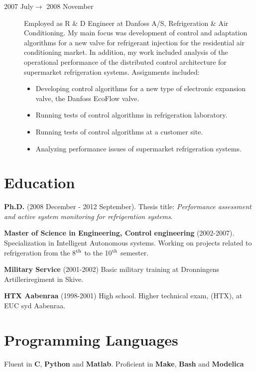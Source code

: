 \documentclass[margin,line,a4paper]{resume}
\begin{document}
\begin{resume}
\begin{description}
    \item[2007 July$\rightarrow$ 2008 November] Employed as R \& D Engineer at Danfoss A/S, Refrigeration \& Air Conditioning. My main focus was development of control and adaptation algorithms for a new valve for refrigerant injection for the residential air conditioning market. In addition, my work included analysis of the operational performance of the distributed control architecture for supermarket refrigeration systems.
      Assignments included:
      \begin{itemize}
      \item Developing control algorithms for a new type of electronic expansion valve, the Danfoss EcoFlow valve.
      \item Running tests of control algorithms in refrigeration laboratory.
      \item Running tests of control algorithms at a customer site.
      \item Analyzing performance issues of supermarket refrigeration systems.
      \end{itemize}

\end{description}

\section{\mysidestyle Education}

    \textbf{Ph.D.} (2008 December - 2012 September). Thesis title: \textit{Performance assessment and active system monitoring for refrigeration systems}.

    \textbf{Master of Science in Engineering, Control engineering}
    (2002-2007). Specialization in Intelligent Autonomous systems. Working on projects related to refrigeration from the 8$^{\rm th}$ to the 10$^{\rm th}$ semester.

    \textbf{Military Service} (2001-2002) Basic military training at Dronningens Artilleriregiment in Skive.

    \textbf{HTX Aabenraa} (1998-2001) High school.  Higher technical exam, (HTX), at EUC syd Aabenraa.


\section{\mysidestyle Programming Languages}

Fluent in \textbf{C}, \textbf{Python} and \textbf{Matlab}. Proficient in \textbf{Make}, \textbf{Bash} and \textbf{Modelica}


\end{resume}
\end{document}
